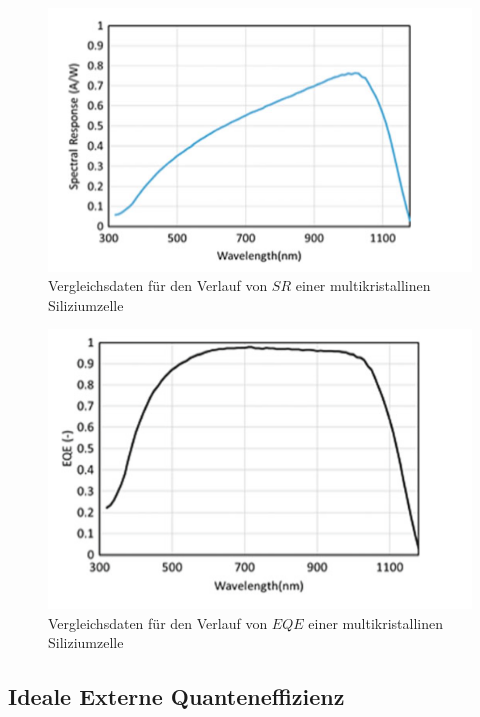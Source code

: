 \begin{figure}[ht]
    \centering
    \includegraphics[scale=0.75]{Bilder/TheorieSR.png}
    \caption{Vergleichsdaten für den Verlauf von $SR$ einer multikristallinen Siliziumzelle \protect \footnotemark}
    \label{bild:ThSR}
\end{figure}


\begin{figure}[ht]
    \centering
    \includegraphics[scale=0.75]{Bilder/TheorieEQE.png}
    \caption{Vergleichsdaten für den Verlauf von $EQE$ einer multikristallinen Siliziumzelle \protect \footnotemark}
    \label{bild:ThEQE}
\end{figure}



\clearpage
\subsection{Ideale Externe Quanteneffizienz}

